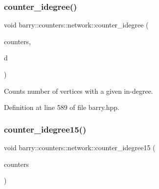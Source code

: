 \mbox{\label{namespacebarry_1_1counters_1_1network_a460e9b4cd736d8ab02ebeb6f84e3e80d}} 
\subsubsection{\texorpdfstring{counter\+\_\+idegree()}{counter\_idegree()}}
{\footnotesize\ttfamily void barry\+::counters\+::network\+::counter\+\_\+idegree (\begin{DoxyParamCaption}\item[{\hyperlink{namespacebarry_1_1counters_1_1network_aa72fdb34752ac24167a06ee196a8fff6}{Net\+Counters} $\ast$}]{counters,  }\item[{std\+::vector$<$ \hyperlink{namespacebarry_a11dfc53ddb4672278319aa04f1e09a6c}{uint} $>$}]{d }\end{DoxyParamCaption})\hspace{0.3cm}{\ttfamily [inline]}}



Counts number of vertices with a given in-\/degree. 



Definition at line 589 of file barry.\+hpp.

\mbox{\label{namespacebarry_1_1counters_1_1network_a27ece7e2bbf1ca87810c5ffbdfcce9fc}} 
\subsubsection{\texorpdfstring{counter\+\_\+idegree15()}{counter\_idegree15()}}
{\footnotesize\ttfamily void barry\+::counters\+::network\+::counter\+\_\+idegree15 (\begin{DoxyParamCaption}\item[{\hyperlink{namespacebarry_1_1counters_1_1network_aa72fdb34752ac24167a06ee196a8fff6}{Net\+Counters} $\ast$}]{counters }\end{DoxyParamCaption})\hspace{0.3cm}{\ttfamily [inline]}}



